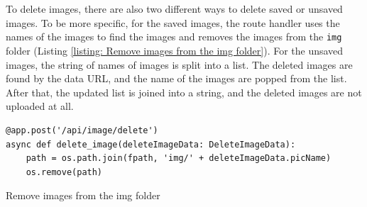 \documentclass{article}
\begin{document}
\\\\
To delete images, there are also two different ways to delete saved or unsaved images. To be more specific, for the saved images, the route handler uses the names of the images to find the images and removes the images from the \verb|img| folder (Listing \ref{listing: Remove images from the img folder}). For the unsaved images, the string of names of images is split into a list. The deleted images are found by the data URL, and the name of the images are popped from the list. After that, the updated list is joined into a string, and the deleted images are not uploaded at all. 
\begin{listing}[!htp]
\begin{verbatim}
@app.post('/api/image/delete')
async def delete_image(deleteImageData: DeleteImageData):
    path = os.path.join(fpath, 'img/' + deleteImageData.picName)
    os.remove(path)
\end{verbatim}
\caption{Remove images from the img folder}
\label{listing: Remove images from the img folder}
\end{listing}
\newpage
\end{document}
